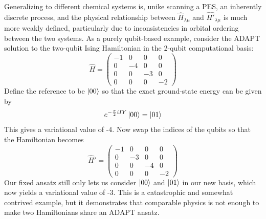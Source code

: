 \documentclass{article}
\begin{document}
Generalizing to different chemical systems is, unike scanning a PES, an inherently discrete process, and the physical relationship between $\hat{H}_{\lambda\mu}$ and $\hat{H'}_{\lambda\mu}$ is much more weakly defined, particularly due to inconsistencies in orbital ordering between the two systems.  As a purely qubit-based example, consider the ADAPT solution to the two-qubit Ising Hamiltonian in the 2-qubit computational basis:
\begin{equation}
\hat{H} = \begin{pmatrix}-1&0&0&0\\0&-4&0&0\\0&0&-3&0\\0&0&0&-2\end{pmatrix}
\end{equation} 
Define the reference to be $\ket{00}$ so that the exact ground-state energy can be given by 
\begin{equation}
e^{-\frac{\pi}{2}iIY}\ket{00} = \ket{01}
\end{equation}
This gives a variational value of -4.  Now swap the indices of the qubits so that the Hamiltonian becomes 
\begin{equation}
\hat{H}' = \begin{pmatrix}-1&0&0&0\\0&-3&0&0\\0&0&-4&0\\0&0&0&-2\end{pmatrix}
\end{equation}
Our fixed ansatz still only lets us consider $\ket{00}$ and $\ket{01}$ in our new basis, which now yields a variational value of -3.  This is a catastrophic and somewhat contrived example, but it demonstrates that comparable physics is not enough to make two Hamiltonians share an ADAPT ansatz. 
\end{document}
